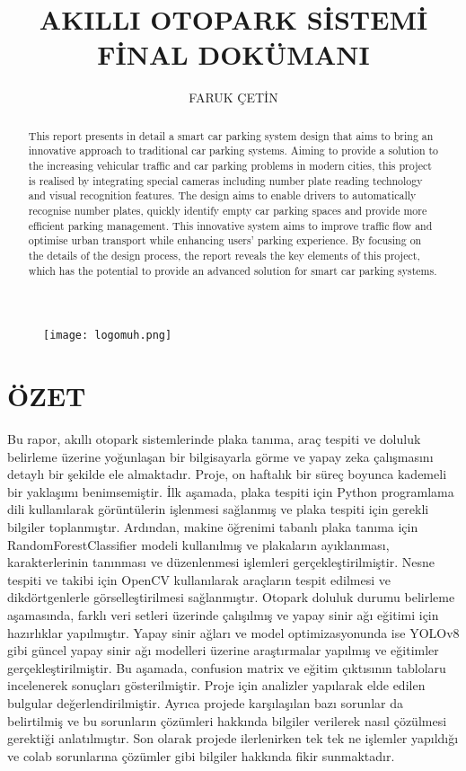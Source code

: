\documentclass[]{article}
\title{AKILLI OTOPARK SİSTEMİ FİNAL DOKÜMANI}
\author{FARUK ÇETİN}
\begin{document}
	\begin{figure}[!ht]
		\centering
		\texttt{[image: logomuh.png]}
		\bigskip
		\maketitle
	\end{figure}
	\bigskip
	\bigskip
	\bigskip
	\begin{abstract}
		This report presents in detail a smart car parking system design that aims to bring an innovative approach to traditional car parking systems. Aiming to provide a solution to the increasing vehicular traffic and car parking problems in modern cities, this project is realised by integrating special cameras including number plate reading technology and visual recognition features. The design aims to enable drivers to automatically recognise number plates, quickly identify empty car parking spaces and provide more efficient parking management. This innovative system aims to improve traffic flow and optimise urban transport while enhancing users' parking experience. By focusing on the details of the design process, the report reveals the key elements of this project, which has the potential to provide an advanced solution for smart car parking systems.
	\end{abstract}
	\newpage
	\tableofcontents{}
	\newpage
	
	
	\section{ÖZET}
	Bu rapor, akıllı otopark sistemlerinde plaka tanıma, araç tespiti ve doluluk belirleme üzerine yoğunlaşan bir bilgisayarla görme ve yapay zeka çalışmasını detaylı bir şekilde ele almaktadır. Proje, on haftalık bir süreç boyunca kademeli bir yaklaşımı benimsemiştir. İlk aşamada, plaka tespiti için Python programlama dili kullanılarak görüntülerin işlenmesi sağlanmış ve plaka tespiti için gerekli bilgiler toplanmıştır. Ardından, makine öğrenimi tabanlı plaka tanıma için RandomForestClassifier modeli kullanılmış ve plakaların ayıklanması, karakterlerinin tanınması ve düzenlenmesi işlemleri gerçekleştirilmiştir. Nesne tespiti ve takibi için OpenCV kullanılarak araçların tespit edilmesi ve dikdörtgenlerle görselleştirilmesi sağlanmıştır. Otopark doluluk durumu belirleme aşamasında, farklı veri setleri üzerinde çalışılmış ve yapay sinir ağı eğitimi için hazırlıklar yapılmıştır. Yapay sinir ağları ve model optimizasyonunda ise YOLOv8 gibi güncel yapay sinir ağı modelleri üzerine araştırmalar yapılmış ve eğitimler gerçekleştirilmiştir. Bu aşamada, confusion matrix ve eğitim çıktısının tablolaru incelenerek sonuçları gösterilmiştir. Proje için analizler yapılarak elde edilen bulgular değerlendirilmiştir. Ayrıca projede karşılaşılan bazı sorunlar da belirtilmiş ve bu sorunların çözümleri hakkında bilgiler verilerek nasıl çözülmesi gerektiği anlatılmıştır. Son olarak projede ilerlenirken tek tek ne işlemler yapıldığı ve colab sorunlarına çözümler gibi bilgiler hakkında fikir sunmaktadır. 
\end{document}
